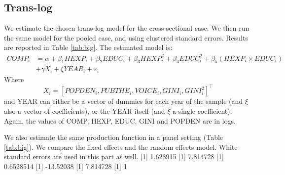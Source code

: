 \documentclass[12pt,a4paper]{article}\usepackage[]{graphicx}\usepackage[]{color}
\begin{document}
\subsection{Trans-log}
We estimate the chosen trans-log model for the cross-sectional case. We then run the same model for the pooled case, and using clustered standard errors. Results are reported in Table \ref{tab:big}. The estimated model is:
\begin{equation}
\begin{aligned}
COMP_i &= \alpha + \beta_1 HEXP_i + \beta_2 EDUC_i + \beta_3 HEXP_i^2 + \beta_4 EDUC_i^2 + \beta_5 \left(HEXP_i \times EDUC_i\right) \\ &+ \gamma X_i + \xi YEAR_i + \varepsilon_i
\end{aligned}
\end{equation}
Where $$ X_i = \left[ POPDEN_i, PUBTHE_i, VOICE_i, GINI_i, GINI_i^2 \right]^\top$$ and YEAR can either be a vector of dummies for each year of the sample (and $\xi$ also a vector of coefficients), or the YEAR itself (and $\xi$ a single coefficient). Again, the values of COMP, HEXP, EDUC, GINI and POPDEN are in logs.


We also estimate the same production function in a panel setting (Table \ref{tab:big}). We compare the fixed effects and the random effects model. White standard errors are used in this part as well.
[1] 1.628915
[1] 7.814728
[1] 0.6528514
[1] -13.52038
[1] 7.814728
[1] 1
\end{document}

